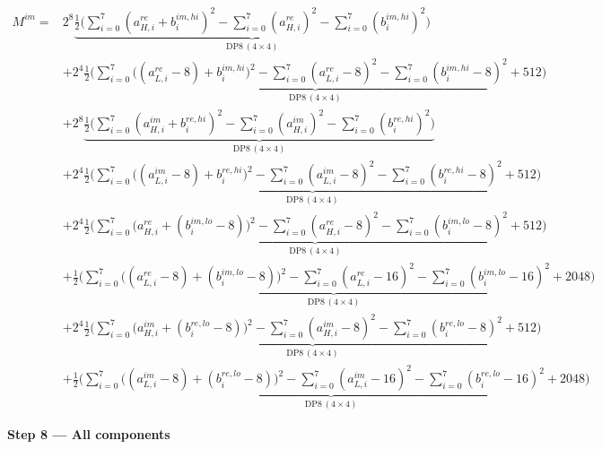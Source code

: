 \documentclass[fleqn]{article}
\newcommand{\DPop}[3]{\mathrm{DP#1}\,(#2\!\times\!#3)}
\begin{document}
\begin{align*}
M^{im} = {}
  & 2^{8}\underbrace{\tfrac12\Big(\sum_{i=0}^{7}(a_{H,i}^{re}{+}b_i^{im,hi})^2 - \sum_{i=0}^{7}(a_{H,i}^{re})^2 - \sum_{i=0}^{7}(b_i^{im,hi})^2\Big)}_{\DPop{8}{4}{4}} \\[0.4em]
  & + 2^{4}\underbrace{\tfrac12\Big(\sum_{i=0}^{7}\big((a_{L,i}^{re}{-}8){+}b_i^{im,hi}\big)^2 - \sum_{i=0}^{7}(a_{L,i}^{re}{-}8)^2 - \sum_{i=0}^{7}(b_i^{im,hi}{-}8)^2 + 512\Big)}_{\DPop{8}{4}{4}} \\[0.4em]
  & + 2^{8}\underbrace{\tfrac12\Big(\sum_{i=0}^{7}(a_{H,i}^{im}{+}b_i^{re,hi})^2 - \sum_{i=0}^{7}(a_{H,i}^{im})^2 - \sum_{i=0}^{7}(b_i^{re,hi})^2\Big)}_{\DPop{8}{4}{4}} \\[0.4em]
  & + 2^{4}\underbrace{\tfrac12\Big(\sum_{i=0}^{7}\big((a_{L,i}^{im}{-}8){+}b_i^{re,hi}\big)^2 - \sum_{i=0}^{7}(a_{L,i}^{im}{-}8)^2 - \sum_{i=0}^{7}(b_i^{re,hi}{-}8)^2 + 512\Big)}_{\DPop{8}{4}{4}} \\[0.4em]
  & + 2^{4}\underbrace{\tfrac12\Big(\sum_{i=0}^{7}\big(a_{H,i}^{re}{+}(b_i^{im,lo}{-}8)\big)^2 - \sum_{i=0}^{7}(a_{H,i}^{re}{-}8)^2 - \sum_{i=0}^{7}(b_i^{im,lo}{-}8)^2 + 512\Big)}_{\DPop{8}{4}{4}} \\[0.4em]
  & + \underbrace{\tfrac12\Big(\sum_{i=0}^{7}\big((a_{L,i}^{re}{-}8){+}(b_i^{im,lo}{-}8)\big)^2 - \sum_{i=0}^{7}(a_{L,i}^{re}{-}16)^2 - \sum_{i=0}^{7}(b_i^{im,lo}{-}16)^2 + 2048\Big)}_{\DPop{8}{4}{4}} \\[0.4em]
  & + 2^{4}\underbrace{\tfrac12\Big(\sum_{i=0}^{7}\big(a_{H,i}^{im}{+}(b_i^{re,lo}{-}8)\big)^2 - \sum_{i=0}^{7}(a_{H,i}^{im}{-}8)^2 - \sum_{i=0}^{7}(b_i^{re,lo}{-}8)^2 + 512\Big)}_{\DPop{8}{4}{4}} \\[0.4em]
  & + \underbrace{\tfrac12\Big(\sum_{i=0}^{7}\big((a_{L,i}^{im}{-}8){+}(b_i^{re,lo}{-}8)\big)^2 - \sum_{i=0}^{7}(a_{L,i}^{im}{-}16)^2 - \sum_{i=0}^{7}(b_i^{re,lo}{-}16)^2 + 2048\Big)}_{\DPop{8}{4}{4}}
\end{align*}

\textbf{Step 8 --- All components}
\end{document}
